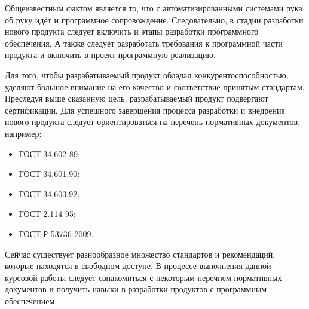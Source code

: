 Общеизвестным фактом является то, что с автоматизированными системами рука об руку идёт и программное сопровождение.
Следовательно, в стадии разработки нового продукта следует включить и этапы разработки программного обеспечения.
А также следует разработать требования к программной части продукта и включить в проект программную реализацию.

Для того, чтобы разрабатываемый продукт обладал конкурентоспособностью, уделяют большое внимание на его качество и соответствие принятым стандартам.
Преследуя выше сказанную цель, разрабатываемый продукт подвергают сертификации.
Для успешного завершения процесса разработки и внедрения нового продукта следует ориентироваться на перечень нормативных документов, например:
\begin{itemize}
\changefontsizes[14pt]{14pt}
	\item ГОСТ 34.602 89\cite{gost89};
	\item ГОСТ 34.601.90\cite{gost90}:
	\item ГОСТ 34.603.92\cite{gost92};
	\item ГОСТ 2.114-95\cite{gost95};
	\item ГОСТ Р 53736-2009\cite{gost09}.
\end{itemize}

Сейчас существует разнообразное множество стандартов и рекомендаций, которые находятся в свободном доступе.
В процессе выполнения данной курсовой работы следует ознакомиться с некоторым перечнем нормативных документов и получить 
навыки в разработки продуктов с программным обеспечением.
